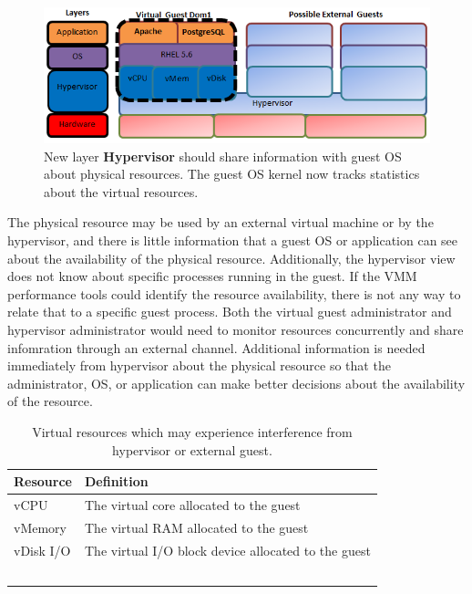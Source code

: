 \begin{figure}[!h]
  \begin{center}
  \includegraphics[width=6in]{images/LayersVirtual.png}
  \caption{New layer \textbf{Hypervisor} should share information with guest OS about physical resources.  The guest OS kernel now tracks statistics about the virtual resources.}
  \label{LayersAndResources}
  \end{center}
\end{figure}

The physical resource may be used by an external virtual machine or by the hypervisor, and there is little information that a guest OS or application can see about the availability of the physical resource.
Additionally, the hypervisor view does not know about specific processes running in the guest.  If the VMM performance tools could identify the resource availability, there is not any way to relate that to a specific guest process.  Both the virtual guest administrator and hypervisor administrator would need to monitor resources concurrently and share infomration through an external channel. 
Additional information is needed immediately from hypervisor about the physical resource so that the administrator, OS, or application can make better decisions about the availability of the resource. 

\begin{table}[h]
  \begin{tabular}{ l p{10cm} }
    Resource & Definition \\
    \hline
    vCPU & The virtual core allocated to the guest \\
    vMemory & The virtual RAM allocated to the guest \\
    vDisk I/O & The virtual I/O block device allocated to the guest \\
    \hline
  \end{tabular}
\caption{Virtual resources which may experience interference from hypervisor or external guest.}
\label{tab:resources}
\end{table}

